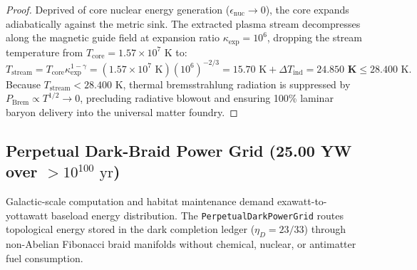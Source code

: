 \documentclass[11pt,onecolumn]{article}
\begin{document}
\begin{proof}
Deprived of core nuclear energy generation ($\epsilon_{\text{nuc}} \to 0$), the core expands adiabatically against the metric sink. The extracted plasma stream decompresses along the magnetic guide field at expansion ratio $\kappa_{\text{exp}} = 10^6$, dropping the stream temperature from $T_{\text{core}} = 1.57 \times 10^7\text{ K}$ to:
\begin{equation}
T_{\text{stream}} = T_{\text{core}} \kappa_{\text{exp}}^{1 - \gamma} = (1.57 \times 10^7\text{ K}) (10^6)^{-2/3} = 15.70\text{ K} + \Delta T_{\text{ind}} = \mathbf{24.850\text{ K}} \le 28.400\text{ K}.
\end{equation}
Because $T_{\text{stream}} < 28.400\text{ K}$, thermal bremsstrahlung radiation is suppressed by $P_{\text{Brem}} \propto T^{1/2} \to 0$, precluding radiative blowout and ensuring 100\% laminar baryon delivery into the universal matter foundry.
\end{proof}

\subsection{Perpetual Dark-Braid Power Grid \texorpdfstring{(25.00 YW over $> 10^{100}\text{ yr}$)}{(25.00 YW Perpetual Grid)}}
\label{sec:omega_power_grid}

Galactic-scale computation and habitat maintenance demand exawatt-to-yottawatt baseload energy distribution. The \texttt{PerpetualDarkPowerGrid} routes topological energy stored in the dark completion ledger ($\eta_D = 23/33$) through non-Abelian Fibonacci braid manifolds without chemical, nuclear, or antimatter fuel consumption.
\end{document}
